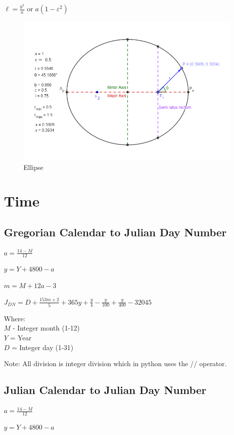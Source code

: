 \documentclass{article}
\begin{document}
$ \ell = \frac{b^2}{a} $ or $ a (1-\varepsilon^2) $

\begin{figure}[h]
	\centering
	\includegraphics[width=0.9\linewidth]{ellipse}
	\caption{Ellipse}
	\label{fig:ellipse}
\end{figure}
\pagebreak

\section{Time}

\subsection{Gregorian Calendar to Julian Day Number}

$ a = \frac{14-M}{12} $

$ y = Y + 4800 - a $

$ m = M + 12 a - 3 $

$ J_{DN} = D + \frac{153m+2}{5} + 365y + \frac{y}{4} - \frac{y}{100} + \frac{y}{400}-32045 $

Where:\\
$M$ - Integer month (1-12)\\
$Y$ = Year\\
$D$ = Integer day (1-31)

Note: All division is integer division which in python uses the // operator.

\subsection{Julian Calendar to Julian Day Number}

$ a = \frac{14-M}{12} $

$ y = Y + 4800 - a $
\end{document}
